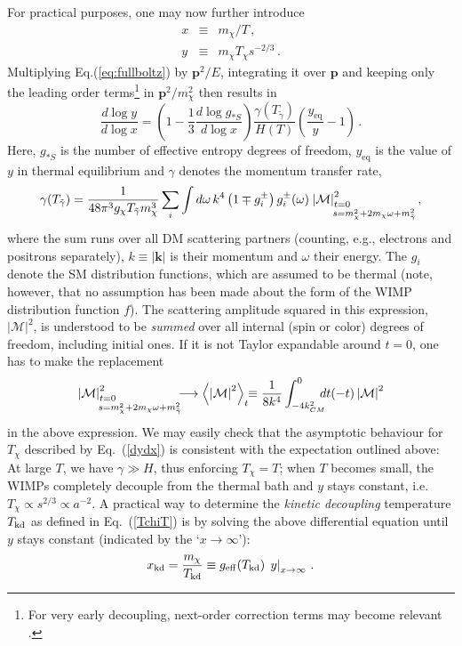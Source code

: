 \documentclass[a4paper,10pt,oneside]{book}
\newcommand{\be}{\begin{equation}}
\newcommand{\ee}{\end{equation}}
\begin{document}
For practical purposes, one may now further introduce
\begin{eqnarray}
   x &\equiv& m_\chi/T\,,\\
   y &\equiv& {m_\chi T_\chi}{s^{-2/3}}\,.
\end{eqnarray}
Multiplying Eq.(\ref{eq:fullboltz}) by $\mathbf{p}^2/E$, integrating it 
over $\mathbf{p}$ and keeping only the leading order terms\footnote{
For very early decoupling, next-order correction terms may become relevant \cite{Binder:2017rgn}.
}
 in $\mathbf{p}^2/m_\chi^2$ 
then results in \cite{Bringmann:2009vf,Bringmann:2016ilk}
\be
\label{dydx}
\frac{d\log y}{d\log x}=\left(1-\frac{1}{3}\frac{d \log g_{*S}}{d\log x}\right)
\frac{\gamma(T_{\tilde\gamma})}{H(T)}\left(\frac{y_\mathrm{eq}}{y}-1\right)\,.
\ee
Here, $g_{*S}$ is the number of effective entropy degrees of freedom, $y_\mathrm{eq}$ is the 
value of $y$ in thermal equilibrium and $\gamma$ denotes the momentum transfer rate, 
\be
\label{fT}
 \gamma (T_{\tilde\gamma})=\frac{1}{48\pi^3g_\chi T_{\tilde\gamma}m_\chi^3}
 \sum_i
 \int d\omega\,k^4
 \left(1\mp g_i^\pm\right)g_i^\pm(\omega)
  \mathop{\hspace{-12ex}\left|\mathcal{M}\right|^2_{t=0}}_{\hspace{4ex}s=m_\chi^2+2m_\chi\omega+m_\mathrm{\tilde\gamma}^2}\,,
\ee
where the sum runs over all DM scattering partners (counting, e.g., electrons and positrons separately), 
$k\equiv\left| \mathbf{k}\right|$ is their momentum and $\omega$ their energy. The $g_i$ denote the SM
distribution functions, which are assumed to be thermal (note, however, that no 
assumption has been made about the form of the WIMP distribution function $f$).
The scattering amplitude
squared in this expression, $|\mathcal{M}|^2$, is understood to be {\it summed} over all internal (spin or 
color) degrees of freedom, including initial ones. If it is not Taylor expandable around $t=0$, one has to 
make the replacement \cite{KasaharaPHD,Gondolo:2012vh} 
\be
\label{maverage}
 \mathop{\hspace{-12ex}\left|\mathcal{M}\right|^2_{t=0}}_{\hspace{4ex}s=m_\chi^2+2m_\chi\omega+m_\mathrm{\tilde\gamma}^2}
\!\!\! \longrightarrow
\left<\left|\mathcal{M}\right|^2\right>_t 
\!\!\equiv \frac{1}{8k^4}\int_{-4k^2_{CM}}^0
\!\!\!\! dt(-t)\left|\mathcal{M}\right|^2
\ee
in the above expression. We may easily check that the asymptotic behaviour 
for $T_\chi$ described by Eq.~(\ref{dydx}) is consistent with the expectation outlined above: 
At large $T$, we have $\gamma\gg H$, thus enforcing
$T_\chi=T$; when $T$ becomes small, the WIMPs completely decouple from the thermal 
bath and $y$ stays constant, i.e. $T_\chi\propto s^{2/3}\propto a^{-2}$. 
A practical way to determine the 
\emph{kinetic decoupling} temperature $T_{\rm kd}$ as defined in Eq.~(\ref{TchiT}) 
is by solving the above differential equation until $y$ stays constant (indicated by the `$x\to\infty$'):
\begin{equation}
  \label{eq:tkddef}
  x_{\rm kd}=\frac{m_\chi}{T_{\rm kd}}\equiv g_{\rm eff}(T_{\rm kd})\, \left.y\right|_{x\rightarrow\infty}\,.
\end{equation}
\end{document}
